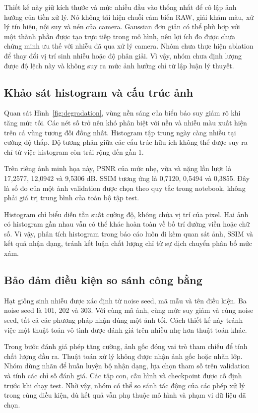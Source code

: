 Thiết kế này giữ kích thước và mức nhiễu đầu vào thống nhất để cô lập ảnh hưởng của tiền xử lý. Nó không tái hiện chuỗi cảm biến RAW, giải khảm màu, xử lý tín hiệu, nội suy và nén của camera. Gaussian đơn giản có thể phù hợp với một thành phần được tạo trực tiếp trong mô hình, nên lợi ích đo được chưa chứng minh ưu thế với nhiễu đã qua xử lý camera. Nhóm chưa thực hiện ablation để thay đổi vị trí sinh nhiễu hoặc độ phân giải. Vì vậy, nhóm chưa định lượng được độ lệch này và không suy ra mức ảnh hưởng chỉ từ lập luận lý thuyết.

\subsection{Khảo sát histogram và cấu trúc ảnh}
Quan sát Hình~\ref{fig:degradation}, vùng nền sáng của biển báo suy giảm rõ khi tăng mức tối. Các nét số trở nên khó phân biệt với nền và nhiễu màu xuất hiện trên cả vùng tương đối đồng nhất. Histogram tập trung ngày càng nhiều tại cường độ thấp. Độ tương phản giữa các cấu trúc hữu ích không thể được suy ra chỉ từ việc histogram còn trải rộng đến gần 1.

Trên riêng ảnh minh họa này, PSNR của mức nhẹ, vừa và nặng lần lượt là 17,2577, 12,0942 và 9,5306 dB. SSIM tương ứng là 0,7120, 0,5494 và 0,3855. Đây là số đo của một ảnh validation được chọn theo quy tắc trong notebook, không phải giá trị trung bình của toàn bộ tập test.

Histogram chỉ biểu diễn tần suất cường độ, không chứa vị trí của pixel. Hai ảnh có histogram gần nhau vẫn có thể khác hoàn toàn về bố trí đường viền hoặc chữ số. Vì vậy, phân tích histogram trong báo cáo luôn đi kèm quan sát ảnh, SSIM và kết quả nhận dạng, tránh kết luận chất lượng chỉ từ sự dịch chuyển phân bố mức xám.

\subsection{Bảo đảm điều kiện so sánh công bằng}
Hạt giống sinh nhiễu được xác định từ noise seed, mã mẫu và tên điều kiện. Ba noise seed là 101, 202 và 303. Với cùng mã ảnh, cùng mức suy giảm và cùng noise seed, tất cả các phương pháp nhận đúng một ảnh tối. Cách thiết kế này tránh việc một thuật toán vô tình được đánh giá trên nhiễu nhẹ hơn thuật toán khác.

Trong bước đánh giá phép tăng cường, ảnh gốc đóng vai trò tham chiếu để tính chất lượng đầu ra. Thuật toán xử lý không được nhận ảnh gốc hoặc nhãn lớp. Nhóm dùng nhãn để huấn luyện bộ nhận dạng, lựa chọn tham số trên validation và tính các chỉ số đánh giá. Các tập con, cấu hình và checkpoint được cố định trước khi chạy test. Nhờ vậy, nhóm có thể so sánh tác động của các phép xử lý trong cùng điều kiện, dù kết quả vẫn phụ thuộc mô hình và phạm vi dữ liệu đã chọn.
